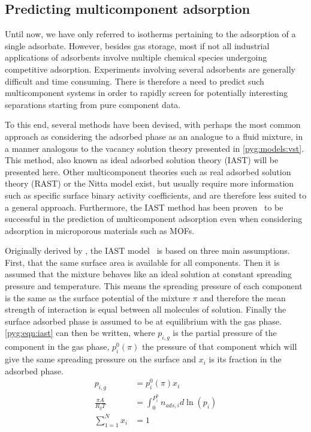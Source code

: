 
\subsection{Predicting multicomponent adsorption}\label{pyg:iast}

Until now, we have only referred to isotherms pertaining to the adsorption
of a single adsorbate. However, besides gas storage, most if not all
industrial applications of adsorbents involve multiple chemical
species undergoing competitive adsorption. Experiments involving
several adsorbents are generally difficult and time consuming.
There is therefore a need to predict such multicomponent systems
in order to rapidly screen for potentially interesting separations
starting from pure component data.

To this end, several methods have been devised, with perhaps
the most common approach as considering the adsorbed phase as
an analogue to a fluid mixture, in a manner analogous to the
vacancy solution theory presented in \autoref{pyg:models:vst}.
This method, also known as ideal adsorbed solution theory (IAST)
will be presented here. Other multicomponent theories
such as real adsorbed solution theory (RAST) or the Nitta model
exist, but usually require more information such as specific
surface binary activity coefficients, and are therefore less suited to
a general approach. Furthermore, the IAST method has been
proven~\cite{cessfordEvaluationIdealAdsorbed2012,%
	vanheestIdentificationMetalOrganic2012} to be successful in the
prediction of multicomponent adsorption even when considering
adsorption in microporous materials such as MOFs.

Originally derived by \citeauthor{myersThermodynamicsMixedgasAdsorption1965},
the IAST model~\cite{myersThermodynamicsMixedgasAdsorption1965} is based
on three main assumptions. First, that the
same surface area is available for all components. Then it is
assumed that the mixture behaves like an ideal solution at constant
spreading pressure and temperature. This means the spreading pressure of
each component is the same as the surface potential of the mixture \(\pi\)
and therefore the mean strength of interaction is equal between all
molecules of solution. Finally the surface adsorbed phase is assumed
to be at equilibrium with the gas phase. \autoref{pyg:eqn:iast}
can then be written, where \(p_{i,g}\) is the partial pressure of
the component in the gas phase, \( p_i^0(\pi)\) the pressure of
that component which will give the same spreading pressure on the
surface and \(x_i\) is its fraction in the adsorbed phase.
%
\begin{align}
	p_{i,g}             & = p_i^0(\pi)x_i                              %
	\label{pyg:eqn:iast}                                               \\
	\frac{\pi A}{R_g T} & = \int_{0}^{P_{i}^{0}} n_{ads,i} d\ln{(p_i)} %
	\label{pyg:eqn:iast-2}                                             \\
	\sum_{1=1}^{N} x_i  & = 1                                          %
	\label{pyg:eqn:iast-3}
\end{align}

